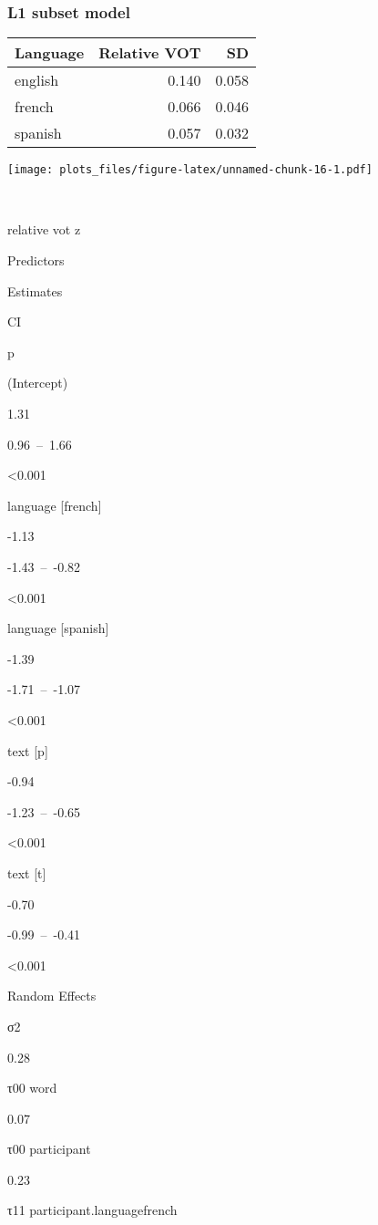 \documentclass[
]{article}
\begin{document}
\hypertarget{l1-subset-model}{%
\subsubsection{L1 subset model}\label{l1-subset-model}}

\begin{longtable}[]{@{}lrr@{}}
\toprule
Language & Relative VOT & SD \\
\midrule
\endhead
english & 0.140 & 0.058 \\
french & 0.066 & 0.046 \\
spanish & 0.057 & 0.032 \\
\bottomrule
\end{longtable}

\texttt{[image: plots\_files/figure-latex/unnamed-chunk-16-1.pdf]}

~

relative vot z

Predictors

Estimates

CI

p

(Intercept)

1.31

0.96~--~1.66

\textless0.001

language {[}french{]}

-1.13

-1.43~--~-0.82

\textless0.001

language {[}spanish{]}

-1.39

-1.71~--~-1.07

\textless0.001

text {[}p{]}

-0.94

-1.23~--~-0.65

\textless0.001

text {[}t{]}

-0.70

-0.99~--~-0.41

\textless0.001

Random Effects

σ2

0.28

τ00 word

0.07

τ00 participant

0.23

τ11 participant.languagefrench
\end{document}
